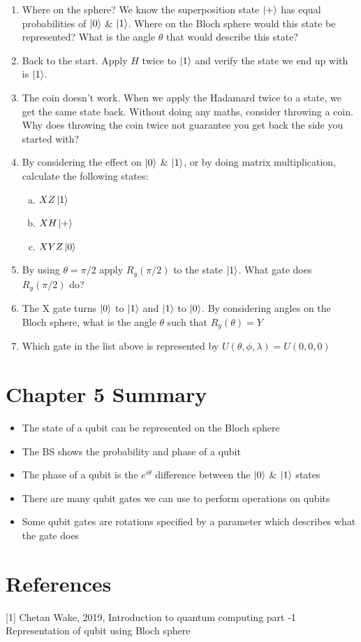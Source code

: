 \begin{enumerate}
    \item Where on the sphere? We know the superposition state $\ket{+}$ has equal probabilities of $\ket{0}$ \& $\ket{1}$. Where on the Bloch sphere would this state be represented? What is the angle $\theta$ that would describe this state?
    \item Back to the start. Apply $H$ twice to $\ket{1}$ and verify the state we end up with is $\ket{1}$. 
    \item  The coin doesn't work. When we apply the Hadamard twice to a state, we get the same state back. Without doing any maths, consider throwing a coin. Why does throwing the coin twice not guarantee you get back the side you started with? 
    \item By considering the effect on $\ket{0}$ \& $ \ket{1}$, or by doing matrix multiplication, calculate the following states:
    
    \begin{enumerate}[a.]
        \item \( XZ\ket{1} \)
        \item \( XH\ket{+} \)
        \item \( XYZ\ket{0} \)
    \end{enumerate}
    \item By using $\theta = \pi/2$ apply $R_y(\pi/2)$ to the state $\ket{1}$. What gate does $R_y(\pi/2)$ do? 
    \item The X gate turns $\ket{0}$ to $\ket{1}$ and $\ket{1}$ to $\ket{0}$. By considering angles on the Bloch sphere, what is the angle $\theta$ such that $R_y(\theta) = Y$
    \item Which gate in the list above is represented by  $U(\theta, \phi, \lambda) = U(0,0,0)$ 
\end{enumerate}



\section{Chapter 5 Summary }

\begin{itemize}
    \item The state of a qubit can be represented on the Bloch sphere
    \item The BS shows the probability and phase of a qubit 
    \item The phase of a qubit is the $e^{i\theta}$ difference between the $\ket{0}$ \& $\ket{1}$ states
    \item There are many qubit gates we can use to perform operations on qubits
    \item Some qubit gates are rotations specified by a parameter which describes what the gate does
    
\end{itemize}

\section{References}

[1] Chetan Wake, 2019, Introduction to quantum computing part -1 Representation of qubit using Bloch sphere

